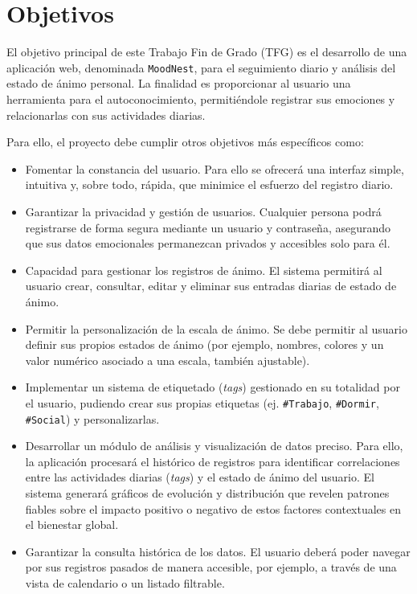 \section{Objetivos}
\label{sec:objetivos}

El objetivo principal de este Trabajo Fin de Grado (TFG) es el desarrollo de una aplicación web, denominada \texttt{MoodNest}, para el seguimiento diario y análisis del estado de ánimo personal. La finalidad es proporcionar al usuario una herramienta para el autoconocimiento, permitiéndole registrar sus emociones y relacionarlas con sus actividades diarias.

Para ello, el proyecto debe cumplir otros objetivos más específicos como:
\begin{itemize}
    \item Fomentar la constancia del usuario. Para ello se ofrecerá una interfaz simple, intuitiva y, sobre todo, rápida, que minimice el esfuerzo del registro diario.
    
    \item Garantizar la privacidad y gestión de usuarios. Cualquier persona podrá registrarse de forma segura mediante un usuario y contraseña, asegurando que sus datos emocionales permanezcan privados y accesibles solo para él.
    
    \item Capacidad para gestionar los registros de ánimo. El sistema permitirá al usuario crear, consultar, editar y eliminar sus entradas diarias de estado de ánimo.
    
    \item Permitir la personalización de la escala de ánimo. Se debe permitir al usuario definir sus propios estados de ánimo (por ejemplo, nombres, colores y un valor numérico asociado a una escala, también ajustable).
    
    \item Implementar un sistema de etiquetado (\textit{tags}) gestionado en su totalidad por el usuario, pudiendo crear sus propias etiquetas (ej. \texttt{\#Trabajo}, \texttt{\#Dormir}, \texttt{\#Social}) y personalizarlas.

    \item Desarrollar un módulo de análisis y visualización de datos preciso. Para ello, la aplicación procesará el histórico de registros para identificar correlaciones entre las actividades diarias (\textit{tags}) y el estado de ánimo del usuario. El sistema generará gráficos de evolución y distribución que revelen patrones fiables sobre el impacto positivo o negativo de estos factores contextuales en el bienestar global.    
    
    \item Garantizar la consulta histórica de los datos. El usuario deberá poder navegar por sus registros pasados de manera accesible, por ejemplo, a través de una vista de calendario o un listado filtrable.
\end{itemize}